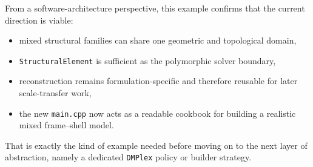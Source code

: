 From a software-architecture perspective, this example confirms that the
current direction is viable:
\begin{itemize}
  \item mixed structural families can share one geometric and topological
        domain,
  \item \texttt{StructuralElement} is sufficient as the polymorphic solver
        boundary,
  \item reconstruction remains formulation-specific and therefore reusable for
        later scale-transfer work,
  \item the new \texttt{main.cpp} now acts as a readable cookbook for building
        a realistic mixed frame--shell model.
\end{itemize}

That is exactly the kind of example needed before moving on to the next layer
of abstraction, namely a dedicated \texttt{DMPlex} policy or builder strategy.

